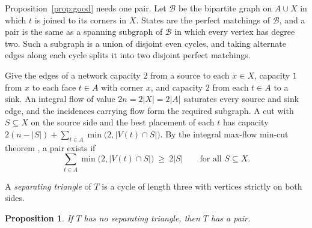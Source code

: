 \documentclass[10pt]{amsart}
\numberwithin{equation}{section}
\newtheorem{proposition}[equation]{Proposition}
\theoremstyle{definition}
\theoremstyle{remark}
\newcommand{\T}{T}
\begin{document}
Proposition~\ref{prop:good} needs one pair.
Let $\mathcal{B}$ be the bipartite graph on $A\cup X$ in which $t$ is joined to its corners in $X$.
States are the perfect matchings of $\mathcal{B}$, and a pair is the same as a spanning subgraph of $\mathcal{B}$ in which every vertex has degree two. Such a subgraph is a union of disjoint even cycles, and taking alternate edges along each cycle splits it into two disjoint perfect matchings.

Give the edges of a network capacity $2$ from a source to each $x\in X$, capacity $1$ from $x$ to each face $t\in A$ with corner $x$, and capacity $2$ from each $t\in A$ to a sink.
An integral flow of value $2n=2|X|=2|A|$ saturates every source and sink edge, and the incidences carrying flow form the required subgraph.
A cut with $S\subseteq X$ on the source side and the best placement of each $t$ has capacity $2(n-|S|)+\sum_{t\in A}\min\bigl(2,|V(t)\cap S|\bigr)$.
By the integral max-flow min-cut theorem \cite{fordfulkerson1956}, a pair exists if
\begin{equation}\label{eq:hall}
\sum_{t\in A}\min\bigl(2,|V(t)\cap S|\bigr)\ \ge\ 2|S|\qquad\text{for all } S\subseteq X .
\end{equation}

A \emph{separating triangle} of $\T$ is a cycle of length three with vertices strictly on both sides.

\begin{proposition}\label{prop:pair}
If $\T$ has no separating triangle, then $\T$ has a pair.
\end{proposition}
\end{document}
